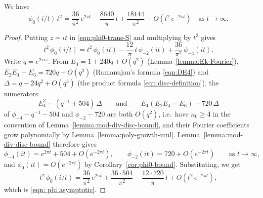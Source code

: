\begin{lemma}\label{lemma:phi0-asymptotic}\leanok
We have
\begin{equation}\label{eqn: phi asymptotic}
\phi_0(i/t)\,t^2=\frac{36}{\pi^2}\,e^{2 \pi t}-\frac{8640}{\pi}\,t+\frac{18144}{\pi^2}+O(t^2\,e^{-2\pi t})\quad\mbox{as}\;t\to\infty.
\end{equation}
\end{lemma}
\begin{proof}
Putting $z = it$ in \eqref{eqn:phi0-trans-S} and multiplying by $t^2$ gives
\[
t^2\,\phi_0(i/t) = t^2\,\phi_0(it) - \frac{12}{\pi}\,t\,\phi_{-2}(it) + \frac{36}{\pi^2}\,\phi_{-4}(it).
\]
Write $q = e^{2\pi i z}$. From $E_4 = 1 + 240 q + O(q^2)$ (Lemma~\ref{lemma:Ek-Fourier}), $E_2 E_4 - E_6 = 720 q + O(q^2)$ (Ramanujan's formula \eqref{eqn:DE4}) and $\Delta = q - 24 q^2 + O(q^3)$ (the product formula \eqref{eqn:disc-definition}), the numerators
\[
E_4^2 - (q^{-1} + 504)\,\Delta \qquad\text{and}\qquad E_4(E_2E_4 - E_6) - 720\,\Delta
\]
of $\phi_{-4} - q^{-1} - 504$ and $\phi_{-2} - 720$ are both $O(q^2)$, i.e.\ have $n_0 \geq 4$ in the convention of Lemma~\ref{lemma:mod-div-disc-bound}, and their Fourier coefficients grow polynomially by Lemma~\ref{lemma:poly-growth-mul}. Lemma~\ref{lemma:mod-div-disc-bound} therefore gives
\[
\phi_{-4}(it) = e^{2\pi t} + 504 + O(e^{-2\pi t}), \qquad \phi_{-2}(it) = 720 + O(e^{-2\pi t}) \qquad\text{as } t \to \infty,
\]
and $\phi_0(it) = O(e^{-2\pi t})$ by Corollary~\ref{cor:phi0-bound}. Substituting, we get
\[
t^2\,\phi_0(i/t) = \frac{36}{\pi^2}\,e^{2\pi t} + \frac{36 \cdot 504}{\pi^2} - \frac{12 \cdot 720}{\pi}\,t + O(t^2\,e^{-2\pi t}),
\]
which is \eqref{eqn: phi asymptotic}.
\end{proof}

